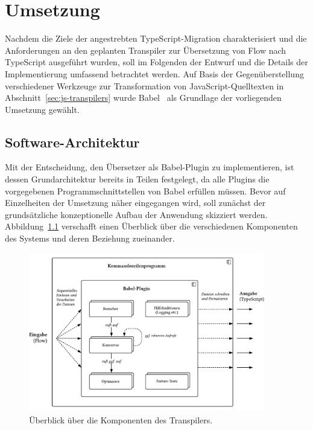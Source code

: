 \chapter{Umsetzung}
\label{chap:implementation}

Nachdem die Ziele der angestrebten TypeScript-Migration charakterisiert und die Anforderungen an den geplanten Transpiler zur Übersetzung von Flow nach TypeScript ausgeführt wurden, soll im Folgenden der Entwurf und die Details der Implementierung umfassend betrachtet werden. Auf Basis der Gegenüberstellung verschiedener Werkzeuge zur Transformation von JavaScript-Quelltexten in Abschnitt~\ref{sec:js-transpilers} wurde Babel~\autocite{BABEL} als Grundlage der vorliegenden Umsetzung gewählt.

\section{Software-Architektur}
\label{sec:software-architecture}

Mit der Entscheidung, den Übersetzer als Babel-Plugin zu implementieren, ist dessen Grundarchitektur bereits in Teilen festgelegt, da alle Plugins die vorgegebenen Programmschnittstellen von Babel erfüllen müssen. Bevor auf Einzelheiten der Umsetzung näher eingegangen wird, soll zunächst der grundsätzliche konzeptionelle Aufbau der Anwendung skizziert werden. Abbildung~\ref{fig:architecture-overview} verschafft einen Überblick über die verschiedenen Komponenten des Systems und deren Beziehung zueinander.

\begin{figure}[tbp]
  \centering
  \includegraphics[width=0.92\textwidth]{src/4_Umsetzung/fig/architecture-overview.pdf}
  \caption{Überblick über die Komponenten des Transpilers.}
  \label{fig:architecture-overview}
\end{figure}

